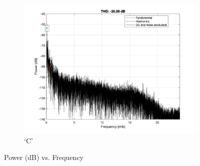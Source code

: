 \documentclass[11pt, oneside]{article}   	%
\begin{document}
\begin{figure}[ht]
\begin{subfigure}[b]{0.3\textwidth}
\includegraphics[width=\textwidth]{imgs/c-power.jpg}
\caption{`C'}
\end{subfigure}
\caption{Power (dB) vs. Frequency}
\label{fig:power}
\end{figure}
\end{document}
